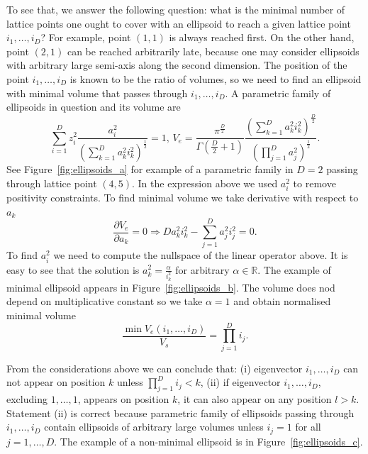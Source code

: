\documentclass{article}
\begin{document}
To see that, we answer the following question: what is the minimal number of lattice points one ought to cover with an ellipsoid to reach a given lattice point $i_1,\dots, i_D$? For example, point $(1, 1)$ is always reached first. On the other hand, point $(2, 1)$ can be reached arbitrarily late, because one may consider ellipsoids with arbitrary large semi-axis along the second dimension. The position of the point $i_1,\dots, i_D$ is known to be the ratio of volumes, so we need to find an ellipsoid with minimal volume that passes through $i_1,\dots, i_D$. A parametric family of ellipsoids in question and its volume are
\begin{equation}
	\sum_{i =1}^{D} z_i^2 \frac{a^2_{i}}{\left(\sum_{k=1}^{D} a^2_{k} i_{k}^2\right)^{\frac{1}{2}}} = 1,\,V_{e} = \frac{\pi^{\frac{D}{2}}}{\Gamma\left(\frac{D}{2} + 1\right)} \frac{\left(\sum_{k=1}^{D} a^2_{k} i_{k}^2\right)^{\frac{D}{2}}}{\left(\prod_{j=1}^{D}a^2_{j}\right)^{\frac{1}{2}}}.
\end{equation}
See Figure~\ref{fig:ellipsoids_a} for example of a parametric family in $D=2$ passing through lattice point $(4, 5)$. In the expression above we used $a_i^2$ to remove positivity constraints. To find minimal volume we take derivative with respect to $a_k$
\begin{equation}
	\frac{\partial V_{e}}{\partial a_{k}} = 0 \Rightarrow D a_{k}^2 i_{k}^2 - \sum_{j=1}^{D} a_{j}^2 i_{j}^2 = 0.
\end{equation}
To find $a_{i}^2$ we need to compute the nullspace of the linear operator above. It is easy to see that the solution is $a_{k}^2 = \frac{\alpha}{i_{k}^2}$ for arbitrary $\alpha \in \mathbb{R}$. The example of minimal ellipsoid appears in Figure~\ref{fig:ellipsoids_b}. The volume does nod depend on multiplicative constant so we take $\alpha = 1$ and obtain normalised minimal volume
\begin{equation}
	\frac{\min V_{e}\left(i_1,\dots, i_D\right)}{V_{s}} = \prod_{j=1}^{D} i_{j}.
\end{equation}

From the considerations above we can conclude that: (i) eigenvector $i_1,\dots, i_{D}$ can not appear on position $k$ unless $\prod_{j=1}^{D} i_{j} < k$, (ii)  if eigenvector $i_1,\dots, i_{D}$, excluding $1, \dots, 1$, appears on position $k$, it can also appear on any position $l>k$. Statement (ii) is correct because parametric family of ellipsoids passing through $i_1,\dots, i_{D}$ contain ellipsoids of arbitrary large volumes unless $i_j = 1$ for all $j=1,\dots,D$. The example of a non-minimal ellipsoid is in Figure~\ref{fig:ellipsoids_c}.
\end{document}
